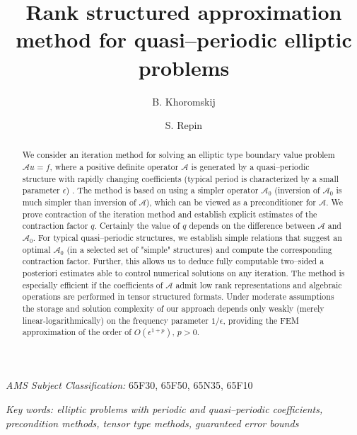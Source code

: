 \documentclass[amstex,amstext,amsfonts,epsf,12pt] {amsart}
\begin{document}
\title[Rank structured method]{Rank structured approximation method for 
quasi--periodic elliptic problems}

\author{B. Khoromskij}
\address{Max Planck Institute for Mathematics in the Sciences, 
Inselstr. 22-26, 04103, Leipzig, Germany; \textit{E-mail:} bokh@mis.mpg.de}
\author{S. Repin}
\address{V.A. Steklov Institute of Mathematics, Fontanka 27,
191 011 St. Petersburg, Russia, and University of Jyv\"askyl\"a, Finland ; 
\textit{E-mail:} repin@pdmi.ras.ru; serepin@jyu.fi}
 

\maketitle
\begin{abstract}
We consider an iteration method for solving an elliptic type boundary value problem 
$\mathcal{A} u=f$, where
 a positive definite operator $\mathcal{A}$ is generated by a quasi--periodic structure
with rapidly changing coefficients (typical period is characterized by a small
parameter $\epsilon$) . The method is based on using a simpler operator $\mathcal{A}_0$ 
(inversion of $\mathcal{A}_0$ is much simpler than inversion of $\mathcal{A}$), 
which can be viewed as a preconditioner for $\mathcal{A}$. We prove contraction of the 
iteration method and establish explicit estimates of the contraction
factor $q$. Certainly the value of $q$ depends on the difference between $\mathcal{A}$ and 
$\mathcal{A}_0$. 
For typical quasi--periodic structures, we establish simple relations that 
suggest an optimal $\mathcal{A}_0$ (in a selected set of "simple" structures) and compute the
corresponding contraction factor. Further, this allows us to
deduce fully computable two--sided a posteriori estimates able to control
numerical solutions on any iteration.  The method is especially efficient
if the coefficients of $\mathcal{A}$ admit low rank representations and algebraic operations
are performed in tensor structured formats.
Under moderate assumptions the storage and solution complexity
of our approach depends only weakly (merely linear-logarithmically) 
on the frequency parameter $1/\epsilon$, 
providing the FEM approximation of the order of $O(\epsilon^{1+p})$, $p>0$.
\end{abstract}



\noindent\emph{AMS Subject Classification:}\textit{ } 65F30, 65F50,
65N35, 65F10

\noindent\emph{Key words: elliptic problems with periodic and quasi--periodic coefficients, 
precondition methods, tensor type methods, guaranteed error bounds} 
\end{document}
